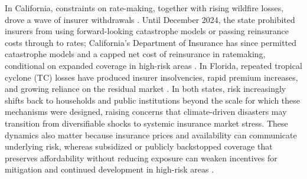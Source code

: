 \documentclass[fleqn,10pt]{wlscirep}
\begin{document}
In California, constraints on rate-making, together with rising wildfire losses, drove a wave of insurer withdrawals \cite{boomhower_how_2024, oh_pricing_2026, CDI2024AnnualReport}. Until December 2024, the state prohibited insurers from using forward-looking catastrophe models or passing reinsurance costs through to rates; California's Department of Insurance has since permitted catastrophe models and a capped net cost of reinsurance in ratemaking, conditional on expanded coverage in high-risk areas \cite{cdi_net_cost_reinsurance_2024}. In Florida, repeated tropical cyclone (TC) losses have produced insurer insolvencies, rapid premium increases, and growing reliance on the residual market \cite{sastry_when_2023, kousky_evolution_2024, hemmati_growing_2025}. In both states, risk increasingly shifts back to households and public institutions beyond the scale for which these mechanisms were designed, raising concerns that climate-driven disasters may transition from diversifiable shocks to systemic insurance market stress. These dynamics also matter because insurance prices and availability can communicate underlying risk, whereas subsidized or publicly backstopped coverage that preserves affordability without reducing exposure can weaken incentives for mitigation and continued development in high-risk areas \cite{ben-shahar_perverse_2016,kousky_addressing_2014,burby_hurricane_2006,peralta_does_2024}.\medskip
\end{document}
